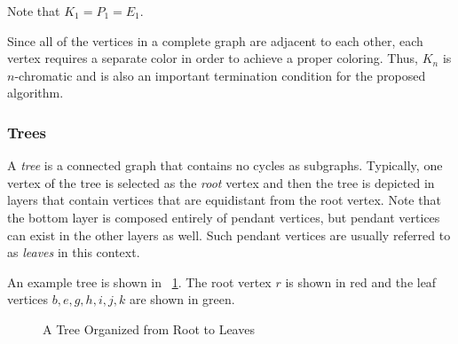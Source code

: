 Note that \(K_1=P_1=E_1\).

Since all of the vertices in a complete graph are adjacent to each other, each vertex requires a separate color in
order to achieve a proper coloring.  Thus, \(K_n\) is \(n\)-chromatic and is also an important termination
condition for the proposed algorithm.

\subsubsection{Trees}\label{sec:sub:sub:trees}

A \emph{tree} is a connected graph that contains no cycles as subgraphs.  Typically, one vertex of the tree is
selected as the \emph{root} vertex and then the tree is depicted in layers that contain vertices that are
equidistant from the root vertex.  Note that the bottom layer is composed entirely of pendant vertices, but pendant
vertices can exist in the other layers as well.  Such pendant vertices are usually referred to as \emph{leaves} in
this context.

An example tree is shown in \figurename~\ref{fig:tree}.  The root vertex \(r\) is shown in red and the leaf
vertices \(b,e,g,h,i,j,k\) are shown in green.

\begin{figure}[H]
  \label{fig:tree}
  \begin{center}
  \end{center}
  \caption{A Tree Organized from Root to Leaves}
\end{figure}

